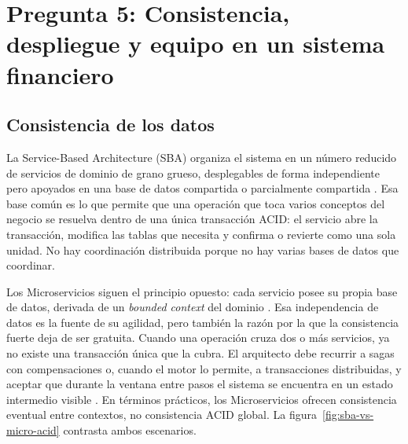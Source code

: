 \section{Pregunta 5: Consistencia, despliegue y equipo en un sistema financiero}

\subsection{Consistencia de los datos}
La Service-Based Architecture (SBA) organiza el sistema en un número reducido de servicios de dominio de grano grueso, desplegables de forma independiente pero apoyados en una base de datos compartida o parcialmente compartida \parencite{richards2020fundamentals}. Esa base común es lo que permite que una operación que toca varios conceptos del negocio se resuelva dentro de una única transacción ACID: el servicio abre la transacción, modifica las tablas que necesita y confirma o revierte como una sola unidad. No hay coordinación distribuida porque no hay varias bases de datos que coordinar.

Los Microservicios siguen el principio opuesto: cada servicio posee su propia base de datos, derivada de un \emph{bounded context} del dominio \parencite{richards2020fundamentals}. Esa independencia de datos es la fuente de su agilidad, pero también la razón por la que la consistencia fuerte deja de ser gratuita. Cuando una operación cruza dos o más servicios, ya no existe una transacción única que la cubra. El arquitecto debe recurrir a sagas con compensaciones o, cuando el motor lo permite, a transacciones distribuidas, y aceptar que durante la ventana entre pasos el sistema se encuentra en un estado intermedio visible \parencite{ford2021hard}. En términos prácticos, los Microservicios ofrecen consistencia eventual entre contextos, no consistencia ACID global. La figura~\ref{fig:sba-vs-micro-acid} contrasta ambos escenarios.

